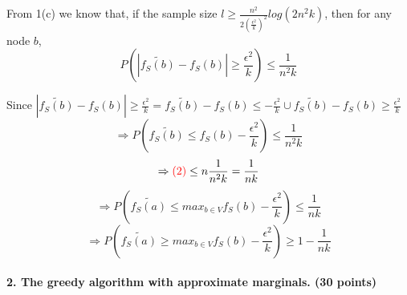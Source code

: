 \documentclass[11pt]{article} %
\begin{document}
\begin{itemize}
From 1(c) we know that, if the sample size $ l \ge \frac{n^2}{2 {(\frac{\epsilon^2}{k})}^2} log(2 n^2 k)$, then for any node $b$, 
$$ P(|\widetilde{f_S(b)}-f_S(b)| \ge \frac{\epsilon^2}{k}) \le \frac{1}{n^2 k}$$

Since ${|\widetilde{f_S(b)}-f_S(b)| \ge \frac{\epsilon^2}{k}}= { \widetilde{f_S(b)}-f_S(b) \le -\frac{\epsilon^2}{k}  } \cup {\widetilde{f_S(b)}-f_S(b) \ge \frac{\epsilon^2}{k}}$
$$ \Rightarrow  P(\widetilde{f_S(b)} \le  f_S(b) - \frac{\epsilon^2}{k}) \le   \frac{1}{n^2 k} $$
$$ \Rightarrow  \textcolor{red}{(2)} \le n \frac{1}{n^2 k} =\frac{1}{n k} $$
$$ \Rightarrow P( \widetilde{f_S(a)} \le max_{b \in V} f_S(b) - \frac{\epsilon^2}{k} ) \le \frac{1}{n k} $$
$$ \Rightarrow P( \widetilde{f_S(a)} \ge max_{b \in V} f_S(b) - \frac{\epsilon^2}{k} ) \ge 1-\frac{1}{n k} $$
\end{itemize}
 
	















	
\paragraph{2. The greedy algorithm with approximate marginals. (30 points)}
\end{document}
